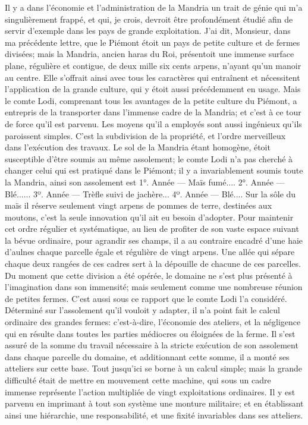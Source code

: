 Il y a dans l'économie et l'administration de la Mandria un trait de génie qui m'a singulièrement frappé, et qui, je crois, devroit être profondément étudié afin de servir\setcounter{page}{430} d'exemple dans les pays de grande exploitation. J'ai dit, Monsieur, dans ma précédente lettre, que le Piémont étoit un pays de petite culture et de fermes divisées; mais la Mandria, ancien haras du Roi, présentoit une immense surface plane, régulière et contigue, de deux mille six cents arpens, n'ayant qu'un manoir au centre. Elle s'offrait ainsi avec tous les caractères qui entraînent et nécessitent l'application de la grande culture, qui y étoit aussi précédemment en usage. Mais le comte Lodi, comprenant tous les avantages de la petite culture du Piémont, a entrepris de la transporter dans l'immense cadre de la Mandria; et c'est à ce tour de force qu'il est parvenu. Les moyens qu'il a employés sont aussi ingénieux qu'ils paroissent simples. C'est la subdivision de la propriété, et l'ordre merveilleux dans l'exécution des travaux.
Le sol de la Mandria étant homogène, étoit susceptible d'être soumis au même assolement; le comte Lodi n'a pas cherché à changer celui qui est pratiqué dans le Piémont; il y a invariablement soumis toute la Mandria, ainsi son assolement est
1°. Année — Maïs fumé....
2°. Année — Blé......
\setcounter{page}{431}
3º. Année — Trèfle suivi de jachère...
4º. Année — Blé....
Sur la sôle du maïs il réserve seulement vingt arpens de pommes de terre, destinées aux moutons, c'est la seule innovation qu'il ait eu besoin d'adopter.
Pour maintenir cet ordre régulier et systématique, au lieu de profiter de son vaste espace suivant la bévue ordinaire, pour agrandir ses champs, il a au contraire encadré d'une haie d'aulnes chaque parcelle égale et régulière de vingt arpens. Une allée qui sépare chaque deux rangées de ces cadres sert à la dépouille de chacune de ces parcelles.
Du moment que cette division a été opérée, le domaine ne s'est plus présenté à l'imagination dans son immensité; mais seulement comme une nombreuse réunion de petites fermes. C'est aussi sous ce rapport que le comte Lodi l'a considéré. Déterminé sur l'assolement qu'il vouloit y adapter, il n'a point fait le calcul ordinaire des grandes fermes: c'est-à-dire, l'économie des ateliers, et la négligence qui en résulte dans toutes les parties médiocres ou éloignées de la ferme. Il s'est assuré de la somme du travail nécessaire à la stricte exécution de son assolement\setcounter{page}{432} dans chaque parcelle du domaine, et additionnant cette somme, il a monté ses atteliers sur cette base. Tout jusqu'ici se borne à un calcul simple; mais la grande difficulté était de mettre en mouvement cette machine, qui sous un cadre immense représente l'action multipliée de vingt exploitations ordinaires. Il y est parvenu en imprimant à tout son système une monture militaire; et en établissant ainsi une hiérarchie, une responsabilité, et une fixité invariables dans ses atteliers.
